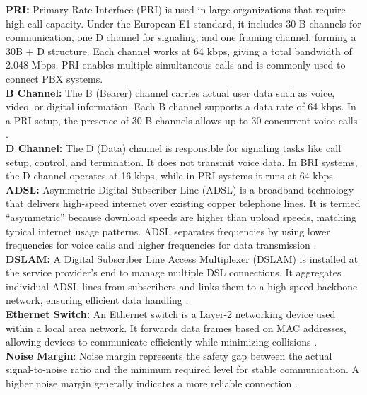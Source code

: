 \documentclass[a4paper,12pt]{article}
\begin{document}
\noindent
\textbf{PRI: }Primary Rate Interface (PRI) is used in large organizations that require high call capacity. Under the European E1 standard, it includes 30 B channels for communication, one D channel for signaling, and one framing channel, forming a 30B + D structure. Each channel works at 64 kbps, giving a total bandwidth of 2.048 Mbps. PRI enables multiple simultaneous calls and is commonly used to connect PBX systems\cite{wikipedia_pri_2026}.\\

\noindent
\textbf{B Channel: }The B (Bearer) channel carries actual user data such as voice, video, or digital information. Each B channel supports a data rate of 64 kbps. In a PRI setup, the presence of 30 B channels allows up to 30 concurrent voice calls \cite{sciencedirect_bri_topic}.\\

\noindent
\textbf{D Channel: }The D (Data) channel is responsible for signaling tasks like call setup, control, and termination. It does not transmit voice data. In BRI systems, the D channel operates at 16 kbps, while in PRI systems it runs at 64 kbps\cite{geeksforgeeks_isdn_computer_network}.\\

\noindent
\textbf{ADSL: }Asymmetric Digital Subscriber Line (ADSL) is a broadband technology that delivers high-speed internet over existing copper telephone lines. It is termed “asymmetric” because download speeds are higher than upload speeds, matching typical internet usage patterns. ADSL separates frequencies by using lower frequencies for voice calls and higher frequencies for data transmission \cite{wikipedia_adsl_2026}.\\

\noindent
\textbf{DSLAM: }A Digital Subscriber Line Access Multiplexer (DSLAM) is installed at the service provider’s end to manage multiple DSL connections. It aggregates individual ADSL lines from subscribers and links them to a high-speed backbone network, ensuring efficient data handling \cite{geeksforgeeks_dslam}.\\

\noindent
\textbf{Ethernet Switch: }An Ethernet switch is a Layer-2 networking device used within a local area network. It forwards data frames based on MAC addresses, allowing devices to communicate efficiently while minimizing collisions \cite{geeksforgeeks_network_devices}.\\

\noindent
\textbf{Noise Margin}: Noise margin represents the safety gap between the actual signal-to-noise ratio and the minimum required level for stable communication. A higher noise margin generally indicates a more reliable connection \cite{edurev_noise_margin}.\\
\end{document}
